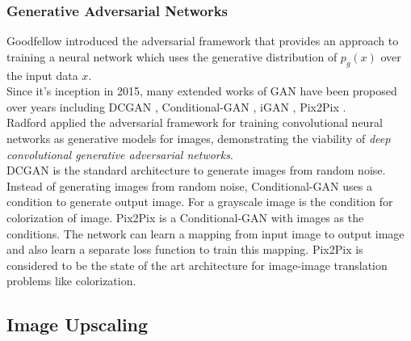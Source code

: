 \documentclass[10pt,twocolumn,letterpaper]{article}
\begin{document}
\subsubsection{Generative Adversarial Networks}
\hspace*{0.167 in}Goodfellow \etal\cite{goodfellow2014generative} introduced the adversarial framework that provides an approach to training a neural network which uses the generative distribution of $p_g(x)$ over the input data $x$.\\
\hspace*{0.167 in}Since it's inception in 2015, many extended works of GAN have been proposed over years including DCGAN \cite{radford2016unsupervised}, Conditional-GAN \cite{mirza2014conditional}, iGAN \cite{zhu2018generative}, Pix2Pix \cite{isola2018imagetoimage}.\\
\hspace*{0.167 in}Radford \etal\cite{radford2016unsupervised} applied the adversarial framework for training convolutional neural networks as generative models for images, demonstrating the viability of \textit{deep convolutional generative adversarial networks}.\\
\hspace*{0.167 in}DCGAN is the standard architecture to generate images from random noise. Instead of generating images from random noise, Conditional-GAN \cite{mirza2014conditional} uses a condition to generate output image. For \eg a grayscale image is the condition for colorization of image. Pix2Pix \cite{isola2018imagetoimage} is a Conditional-GAN with images as the conditions. The network can learn a mapping from input image to output image and also learn a separate loss function to train this mapping. Pix2Pix is considered to be the state of the art architecture for image-image translation problems like colorization.
\subsection{Image Upscaling}
\end{document}
